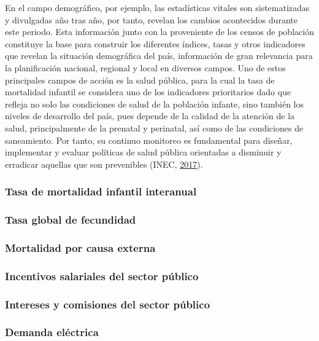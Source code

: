 \documentclass[
]{article}
\begin{document}
En el campo demográfico, por ejemplo, las estadísticas vitales son
sistematizadas y divulgadas año tras año, por tanto, revelan los cambios
acontecidos durante este periodo. Esta información junto con la
proveniente de los censos de población constituye la base para construir
los diferentes índices, tasas y otros indicadores que revelan la
situación demográfica del país, información de gran relevancia para la
planificación nacional, regional y local en diversos campos. Uno de
estos principales campos de acción es la salud pública, para la cual la
tasa de mortalidad infantil se considera uno de los indicadores
prioritarios dado que refleja no solo las condiciones de salud de la
población infante, sino también los niveles de desarrollo del país, pues
depende de la calidad de la atención de la salud, principalmente de la
prenatal y perinatal, así como de las condiciones de saneamiento. Por
tanto, su continuo monitoreo es fundamental para diseñar, implementar y
evaluar políticas de salud pública orientadas a disminuir y erradicar
aquellas que son prevenibles (INEC,
\protect\hyperlink{ref-calidad_vitales}{2017}).

\subsubsection{Tasa de mortalidad infantil interanual}

\subsubsection{Tasa global de fecundidad}

\subsubsection{Mortalidad por causa externa}

\subsubsection{Incentivos salariales del sector público}

\subsubsection{Intereses y comisiones del sector público}

\subsubsection{Demanda eléctrica}
\end{document}
